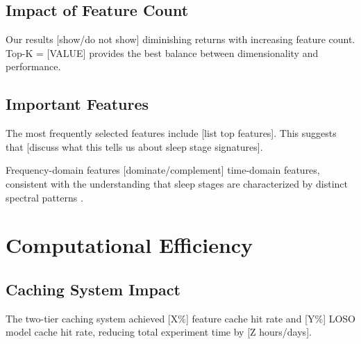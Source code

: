 \subsection{Impact of Feature Count}
\label{subsec:feature_count}


Our results [show/do not show] diminishing returns with increasing feature count. Top-K = [VALUE] provides the best balance between dimensionality and performance.

\subsection{Important Features}
\label{subsec:important_features_discussion}


The most frequently selected features include [list top features]. This suggests that [discuss what this tells us about sleep stage signatures].

Frequency-domain features [dominate/complement] time-domain features, consistent with the understanding that sleep stages are characterized by distinct spectral patterns \cite{TODO_ADD_REF}.

\section{Computational Efficiency}
\label{sec:efficiency_discussion}

\subsection{Caching System Impact}
\label{subsec:caching_impact}

The two-tier caching system achieved [X\%] feature cache hit rate and [Y\%] LOSO model cache hit rate, reducing total experiment time by [Z hours/days].


